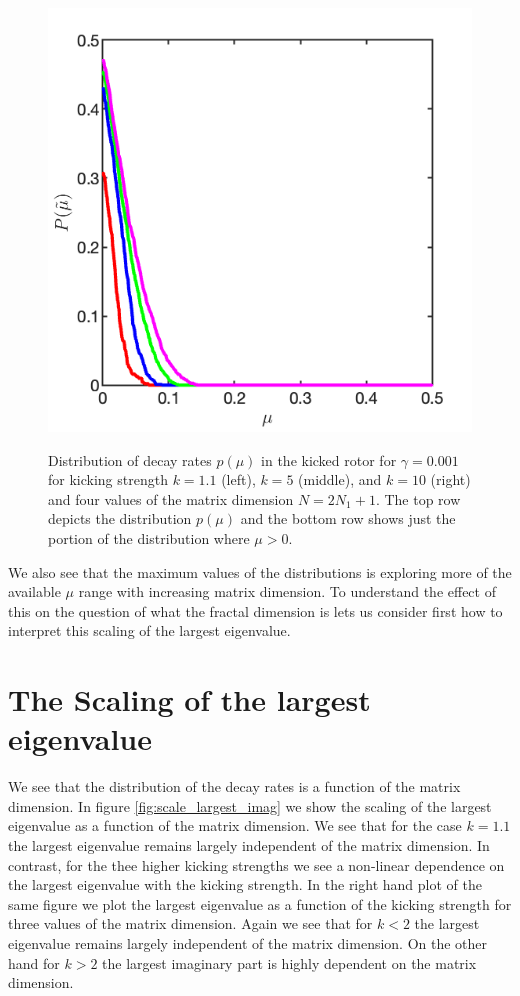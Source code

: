 \documentclass{iopart}
\begin{document}
\begin{figure}[h!]
	{\includegraphics[width=0.32\columnwidth]{pmu_distribution_gain_k10_g1_2x3}}\\
	\caption{Distribution of decay rates $p(\mu)$ in the kicked rotor for  $\gamma=0.001$ for kicking strength $k=1.1$ (left), $k=5$ (middle), and $k=10$ (right) and four values of the matrix dimension  $N=2N_1+1$. The top row depicts the distribution $p(\mu)$ and the bottom row shows just the portion of the distribution where $\mu>0$.}
	\label{fig:ptkr_pmu_quant}
\end{figure}

We also see that the maximum values of the distributions is exploring more of the available $\mu$ range with increasing matrix dimension. To understand the effect of this on the question of what the fractal dimension is lets us consider first how to interpret this scaling of the largest eigenvalue.

\section{The Scaling of the largest eigenvalue}

We see that the distribution of the decay rates is a function of the matrix dimension. In figure \ref{fig:scale_largest_imag} we show the scaling of the largest eigenvalue as a function of the matrix dimension. We see that for the case $k=1.1$ the largest eigenvalue remains largely independent of the matrix dimension. In contrast, for the thee higher kicking strengths we see a non-linear dependence on the largest eigenvalue with the kicking strength. In the right hand plot of the same figure we plot the largest eigenvalue as a function of the kicking strength for three values of the matrix dimension. Again we see that for $k<2$ the largest eigenvalue remains largely independent of the matrix dimension. On the other hand for $k>2$ the largest imaginary part is highly dependent on the matrix dimension. 
\end{document}

